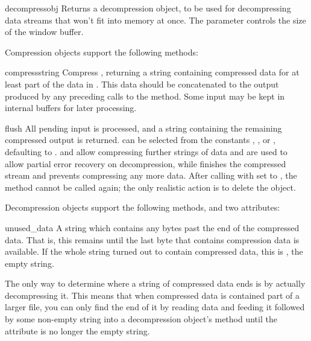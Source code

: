 \begin{funcdesc}{decompressobj}{}
  Returns a decompression object, to be used for decompressing data
  streams that won't fit into memory at once.  The 
  parameter controls the size of the window buffer.
\end{funcdesc}

Compression objects support the following methods:

\begin{methoddesc}[Compress]{compress}{string}
Compress , returning a string containing compressed data
for at least part of the data in .  This data should be
concatenated to the output produced by any preceding calls to the
 method.  Some input may be kept in internal buffers
for later processing.
\end{methoddesc}

\begin{methoddesc}[Compress]{flush}{}
All pending input is processed, and a string containing the remaining
compressed output is returned.   can be selected from the
constants ,  ,  or 
, defaulting to .   and 
 allow compressing further strings of data and
are used to allow partial error recovery on decompression, while
 finishes the compressed stream and 
prevents compressing any more data.  After calling
 with  set to , the
 method cannot be called again; the only realistic
action is to delete the object.  
\end{methoddesc}

Decompression objects support the following methods, and two attributes:

\begin{memberdesc}{unused_data}
A string which contains any bytes past the end of the compressed data.
That is, this remains  until the last byte that contains
compression data is available.  If the whole string turned out to
contain compressed data, this is , the empty string.

The only way to determine where a string of compressed data ends is by
actually decompressing it.  This means that when compressed data is
contained part of a larger file, you can only find the end of it by
reading data and feeding it followed by some non-empty string into a
decompression object's  method until the
 attribute is no longer the empty string.
\end{memberdesc}

